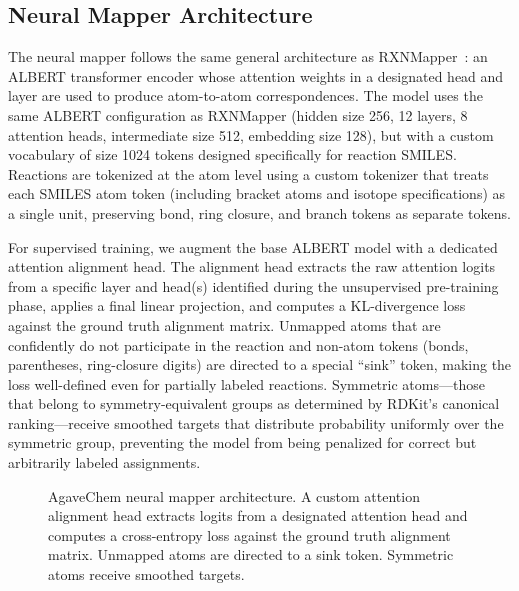 \documentclass[12pt]{article}
\begin{document}
\subsection{Neural Mapper Architecture}
\label{subsec:neural_arch}

The neural mapper follows the same general architecture as
RXNMapper~\cite{Schwaller2021}: an ALBERT transformer encoder whose
attention weights in a designated head and layer are used to produce
atom-to-atom correspondences.  The model uses the same ALBERT
configuration as RXNMapper (hidden size 256, 12 layers, 8 attention
heads, intermediate size 512, embedding size 128), but with a
custom vocabulary of size 1024 tokens designed specifically for
reaction SMILES.  Reactions are tokenized at the atom level using a
custom tokenizer that treats each SMILES atom token (including bracket
atoms and isotope specifications) as a single unit, preserving bond,
ring closure, and branch tokens as separate tokens.

For supervised training, we augment the base ALBERT model with a
dedicated attention alignment head.  The alignment head extracts the
raw attention logits from a specific layer and head(s) identified during
the unsupervised pre-training phase, applies a final linear projection,
and computes a KL-divergence loss against the ground truth alignment
matrix.  Unmapped atoms that are confidently do not participate in the reaction
 and non-atom tokens (bonds, parentheses,
ring-closure digits) are directed to a special ``sink'' token, making
the loss well-defined even for partially labeled reactions.  Symmetric
atoms---those that belong to symmetry-equivalent groups as determined
by RDKit's canonical ranking---receive smoothed targets that distribute
probability uniformly over the symmetric group, preventing the model
from being penalized for correct but arbitrarily labeled assignments.

\begin{figure}[htbp]
  \centering
  \caption{AgaveChem neural mapper architecture.  A custom attention
    alignment head extracts logits from a designated attention head and
    computes a cross-entropy loss against the ground truth alignment
    matrix.  Unmapped atoms are directed to a sink token.  Symmetric
    atoms receive smoothed targets.}
  \label{fig:arch}
\end{figure}
\end{document}

